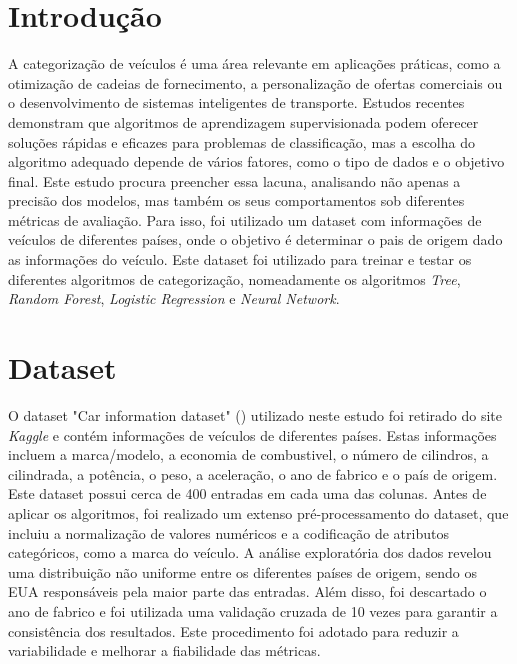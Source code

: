 \documentclass[conference]{IEEEtran}
\begin{document}
\section{Introdução}
A categorização de veículos é uma área relevante em aplicações práticas, como a otimização de cadeias de fornecimento, a personalização
de ofertas comerciais ou o desenvolvimento de sistemas inteligentes de transporte. Estudos recentes demonstram que algoritmos de
aprendizagem supervisionada podem oferecer soluções rápidas e eficazes para problemas de classificação, mas a escolha do algoritmo
adequado depende de vários fatores, como o tipo de dados e o objetivo final. Este estudo procura preencher essa lacuna, analisando não
apenas a precisão dos modelos, mas também os seus comportamentos sob diferentes métricas de avaliação. Para isso, foi utilizado um
dataset com informações de veículos de diferentes países, onde o objetivo é determinar o pais de origem dado as informações do veículo.
Este dataset foi utilizado para treinar e testar os diferentes algoritmos de categorização, nomeadamente os algoritmos \textit{Tree},
\textit{Random Forest}, \textit{Logistic Regression} e \textit{Neural Network}.

\section{Dataset}
O dataset "Car information dataset" (\cite{ref1}) utilizado neste estudo foi retirado do site \textit{Kaggle} e contém informações de
veículos de diferentes países. Estas informações incluem a marca/modelo, a economia de combustivel, o número de cilindros, a cilindrada,
a potência, o peso, a aceleração, o ano de fabrico e o país de origem. Este dataset possui cerca de 400 entradas em cada uma das colunas.
Antes de aplicar os algoritmos, foi realizado um extenso pré-processamento do dataset, que incluiu a normalização de valores numéricos
e a codificação de atributos categóricos, como a marca do veículo. A análise exploratória dos dados revelou uma distribuição não uniforme
entre os diferentes países de origem, sendo os EUA responsáveis pela maior parte das entradas. Além disso, foi descartado o ano de fabrico
e foi utilizada uma validação cruzada de 10 vezes para garantir a consistência dos resultados. Este procedimento foi adotado para reduzir
a variabilidade e melhorar a fiabilidade das métricas.
\end{document}
